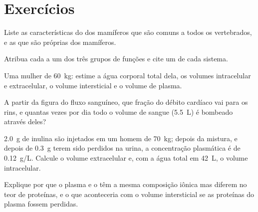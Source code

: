 \section{Exercícios}

\begin{exercise}[$\star$]\label{exo:b1:mammal-organization:1}
Liste as características do  dos mamíferos que são
comuns a todos os vertebrados, e as que são próprias dos mamíferos.
\end{exercise}

\begin{exercise}[$\star$]\label{exo:b1:mammal-organization:2}
Atribua cada  a um dos três grupos de funções e cite um
 de cada sistema.
\end{exercise}

\begin{exercise}[$\star$]\label{exo:b1:mammal-organization:3}
Uma mulher de \qty{60}{kg}: estime a água corporal total dela, os
volumes intracelular e extracelular, o volume intersticial e o volume de
plasma.
\end{exercise}

\begin{exercise}[$\star$]\label{exo:b1:mammal-organization:4}
A partir da figura do fluxo sanguíneo, que fração do débito cardíaco vai
para os rins, e quantas vezes por dia todo o volume de sangue
(\qty{5.5}{L}) é bombeado através deles?
\end{exercise}

\begin{exercise}[$\star\star$]\label{exo:b1:mammal-organization:5}
\qty{2.0}{g} de inulina são injetados em um homem de \qty{70}{kg};
depois da mistura, e depois de \qty{0.3}{g} terem sido perdidos na
urina, a concentração plasmática é de \qty{0.12}{g/L}. Calcule o volume
extracelular e, com a água total em \qty{42}{L}, o volume intracelular.
\end{exercise}

\begin{exercise}[$\star\star$]\label{exo:b1:mammal-organization:6}
Explique por que o plasma e o  têm a mesma
composição iônica mas diferem no teor de proteínas, e o que aconteceria
com o volume intersticial se as proteínas do plasma fossem perdidas.
\end{exercise}

